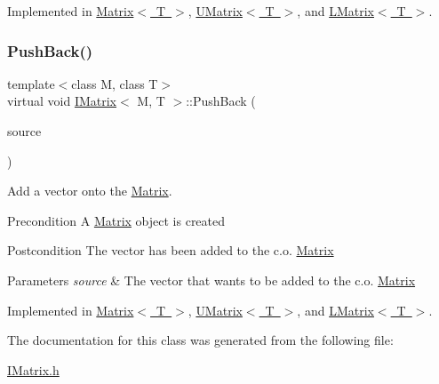 Implemented in \mbox{\hyperlink{class_matrix_a56c7f18f272e74bee2b616eba702fc87}{Matrix$<$ T $>$}}, \mbox{\hyperlink{class_u_matrix_ab0ad5eda96c9a8bb9ca8c69d4bb8d5f8}{U\+Matrix$<$ T $>$}}, and \mbox{\hyperlink{class_l_matrix_a56ec5ba9be0bb900ddc0ee7c5283bccd}{L\+Matrix$<$ T $>$}}.

\mbox{\label{class_i_matrix_aa5de147c7aa5b74b0f2177ed1a8158de}} 
\subsubsection{\texorpdfstring{PushBack()}{PushBack()}}
{\footnotesize\ttfamily template$<$class M, class T$>$ \\
virtual void \mbox{\hyperlink{class_i_matrix}{I\+Matrix}}$<$ M, T $>$\+::Push\+Back (\begin{DoxyParamCaption}\item[{const \mbox{\hyperlink{class_my_vector}{My\+Vector}}$<$ T $>$ \&}]{source }\end{DoxyParamCaption})\hspace{0.3cm}{\ttfamily [pure virtual]}}



Add a vector onto the \mbox{\hyperlink{class_matrix}{Matrix}}. 

\begin{DoxyPrecond}{Precondition}
A \mbox{\hyperlink{class_matrix}{Matrix}} object is created 
\end{DoxyPrecond}
\begin{DoxyPostcond}{Postcondition}
The vector has been added to the c.\+o. \mbox{\hyperlink{class_matrix}{Matrix}}
\end{DoxyPostcond}

\begin{DoxyParams}{Parameters}
{\em source} & The vector that wants to be added to the c.\+o. \mbox{\hyperlink{class_matrix}{Matrix}} \\
\hline
\end{DoxyParams}


Implemented in \mbox{\hyperlink{class_matrix_af61aaa671b6bd354b27fb3aabbb65a9d}{Matrix$<$ T $>$}}, \mbox{\hyperlink{class_u_matrix_a57003b0a0f3fe394ab04f9588732a928}{U\+Matrix$<$ T $>$}}, and \mbox{\hyperlink{class_l_matrix_a3f82539f6b2251d49a2e39c7c359b92d}{L\+Matrix$<$ T $>$}}.



The documentation for this class was generated from the following file\+:\begin{DoxyCompactItemize}
\item 
\mbox{\hyperlink{_i_matrix_8h}{I\+Matrix.\+h}}\end{DoxyCompactItemize}

